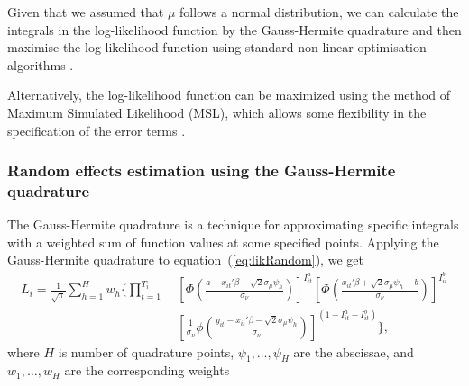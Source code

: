 \documentclass[article,nojss]{jss}
\newcommand{\dnorm}{\phi}%
\newcommand{\pnorm}{\Phi}%
\begin{document}
Given that we assumed that $\mu$ follows a normal distribution,
we can calculate the integrals in the log-likelihood function
by the Gauss-Hermite quadrature and then maximise the log-likelihood function
using standard non-linear optimisation algorithms
\citep[see][]{butler82}.

Alternatively, the log-likelihood function can be maximized
using the method of Maximum Simulated Likelihood (MSL),
which allows some flexibility in the specification
of the error terms \citep[p.~799]{greene08}.


\subsubsection{Random effects estimation using the Gauss-Hermite quadrature}

The Gauss-Hermite quadrature is a technique
for approximating specific integrals
with a weighted sum of function values at some specified points.
Applying the Gauss-Hermite quadrature to equation~(\ref{eq:likRandom}),
we get
\begin{align}
L_i  = \frac{1}{\sqrt{\pi}}
   \sum_{h=1}^H w_h
   \Bigg\{ \prod_{t=1}^{T_i} \;&
      \left[
         \pnorm \left( \frac{ a - x_{it} ' \beta - \sqrt{2} \sigma_\mu \psi_h }
            { \sigma_\nu } \right)
      \right]^{I_{it}^a}
      \left[
         \pnorm \left( \frac{ x_{it} ' \beta + \sqrt{2} \sigma_\mu \psi_h - b }
            { \sigma_\nu } \right)
      \right]^{I_{it}^b}
      \label{eq:likRandomGhq}\\
      & \left[
         \frac{1}{\sigma_\nu}
         \dnorm \left( \frac{ y_{it} - x_{it} ' \beta - \sqrt{2} \sigma_\mu \psi_h }
            { \sigma_\nu } \right)
      \right]^{\left( 1 - I_{it}^a - I_{it}^b \right)}
   \Bigg\},  \nonumber
\end{align}
where $H$ is number of quadrature points,
$\psi_1 , \ldots , \psi_H$ are the abscissae, and
$w_1, \ldots , w_H$ are the corresponding weights
\citep[p.~553]{greene08}
 




\end{document}
